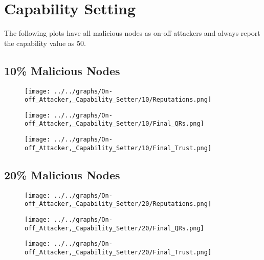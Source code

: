 \section*{Capability Setting}
The following plots have all malicious nodes as on-off attackers and always
report the capability value as 50.
\\
\begin{minipage}[t]{0.49\columnwidth}
\subsection*{10\% Malicious Nodes}
    \begin{figure}[H]
        \centering
        \texttt{[image: ../../graphs/On-off\_Attacker,\_Capability\_Setter/10/Reputations.png]}
    \end{figure}
    \begin{figure}[H]
        \centering
        \texttt{[image: ../../graphs/On-off\_Attacker,\_Capability\_Setter/10/Final\_QRs.png]}
    \end{figure}
\end{minipage}
\begin{minipage}[t]{0.49\columnwidth}
    \begin{figure}[H]
        \centering
        \texttt{[image: ../../graphs/On-off\_Attacker,\_Capability\_Setter/10/Final\_Trust.png]}
    \end{figure}
\end{minipage}

\begin{minipage}[t]{0.49\columnwidth}
\subsection*{20\% Malicious Nodes}
    \begin{figure}[H]
        \centering
        \texttt{[image: ../../graphs/On-off\_Attacker,\_Capability\_Setter/20/Reputations.png]}
    \end{figure}
    \begin{figure}[H]
        \centering
        \texttt{[image: ../../graphs/On-off\_Attacker,\_Capability\_Setter/20/Final\_QRs.png]}
    \end{figure}
\end{minipage}
\begin{minipage}[t]{0.49\columnwidth}
    \begin{figure}[H]
        \centering
        \texttt{[image: ../../graphs/On-off\_Attacker,\_Capability\_Setter/20/Final\_Trust.png]}
    \end{figure}
\end{minipage}

